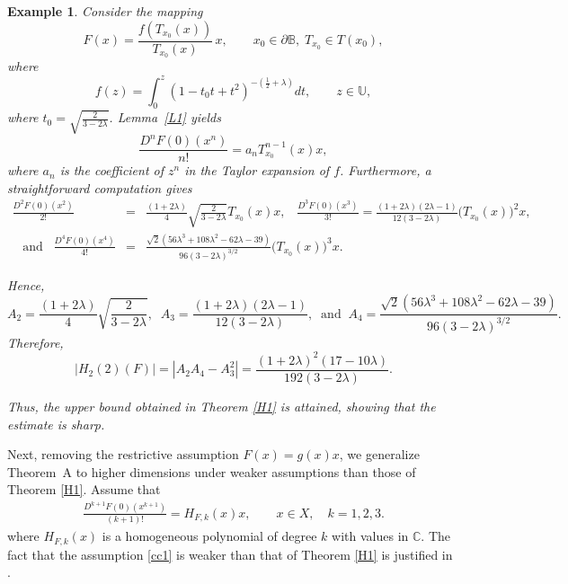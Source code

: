 \documentclass[11pt, reqno]{amsart}
\newtheorem{exm}{Example}[section]
\numberwithin{equation}{section}
\newcommand{\beas}{\begin{eqnarray*}}
\newcommand{\eeas}{\end{eqnarray*}}
\newcommand{\bea}{\begin{eqnarray}}
\newcommand{\eea}{\end{eqnarray}}
\begin{document}
\begin{exm}
Consider the mapping
\[
F(x)=
\frac{f\!\left(T_{x_0}(x)\right)}{T_{x_0}(x)}\,x,
\qquad
x_0\in\partial\mathbb{B},\;
T_{x_0}\in T(x_0),
\]
where
\[
f(z)=\int_0^{z}(1-t_0t+t^2)^{-(\frac{1}{2}+\lambda)}dt,
\qquad z\in\mathbb{U},
\]
where $t_0=\sqrt{\frac{2}{3-2\lambda}}$.
Lemma~\ref{L1} yields 
\[\frac{D^nF(0)(x^n)}{n!}=a_nT_{x_0}^{n-1}(x)x,\]
where $a_n$ is the coefficient of $z^n$ in the Taylor expansion of $f$.
Furthermore, a straightforward computation gives
\beas
\frac{D^2F(0)(x^2)}{2!}&=&\frac{(1+2\lambda)}{4}\sqrt{\frac{2}{3-2\lambda}}T_{x_0}(x)x,\;\;\;
\frac{D^3F(0)(x^3)}{3!}
=\frac{(1+2\lambda)(2\lambda-1)}{12(3-2\lambda)}
\bigl(T_{x_0}(x)\bigr)^2x,\\
\;\;\;\text{and}\;\;\;
\frac{D^4F(0)(x^4)}{4!}&=&\frac{\sqrt2\left(56\lambda^3+108\lambda^2-62\lambda-39\right)}{96(3-2\lambda)^{3/2}}\bigl(T_{x_0}(x)\bigr)^3x.
\eeas

Hence,
\[
A_2=\frac{(1+2\lambda)}{4}\sqrt{\frac{2}{3-2\lambda}},\;\;
A_3=\frac{(1+2\lambda)(2\lambda-1)}{12(3-2\lambda)},\;\;\text{and}\;\;
A_4=\frac{\sqrt2\left(56\lambda^3+108\lambda^2-62\lambda-39\right)}{96(3-2\lambda)^{3/2}}.
\]
Therefore,
\[
|H_{2}(2)(F)|
=
\left|A_2A_4-A_3^2\right|
=
 \frac{(1+2\lambda)^2(17-10\lambda)}{192(3-2\lambda)}.\]

Thus, the upper bound obtained in Theorem \ref{H1} is attained, showing that the estimate is sharp.
\end{exm}


\medskip

Next, removing the restrictive assumption $F(x)=g(x)x$, we generalize Theorem~A to higher dimensions under weaker assumptions than those of Theorem \ref{H1}. Assume that
\bea\label{cc1}
\frac{D^{k+1}F(0)\left(x^{k+1}\right)}{(k+1)!}
= H_{F,k}(x)x,\qquad x\in X,\quad k=1,2,3.
\eea
where $H_{F,k}(x)$ is a homogeneous polynomial of degree $k$ with values in $\mathbb{C}$. The fact that the assumption \eqref{cc1} is weaker than that of Theorem \ref{H1} is justified in \cite{EJ2024,H2023}.
\end{document}
